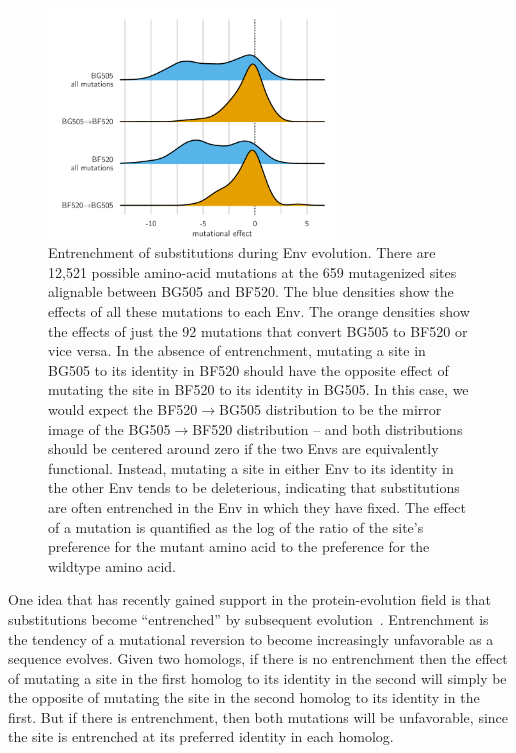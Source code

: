 \documentclass[9pt]{elife}
\begin{document}
\begin{figure}
\centerline{\includegraphics[clip=true, trim=0in 0in 0in 0.7in, width=0.68\textwidth]{figures/entrenchment.pdf}}
\caption{\label{fig:entrenchment}
Entrenchment of substitutions during Env evolution.
There are 12,521 possible amino-acid mutations at the 659 mutagenized sites alignable between BG505 and BF520.
The blue densities show the effects of all these mutations to each Env.
The orange densities show the effects of just the 92 mutations that convert BG505 to BF520 or vice versa.
In the absence of entrenchment, mutating a site in BG505 to its identity in BF520 should have the opposite effect of mutating the site in BF520 to its identity in BG505.
In this case, we would expect the BF520$\rightarrow$BG505 distribution to be the mirror image of the BG505$\rightarrow$BF520 distribution -- and both distributions should be centered around zero if the two Envs are equivalently functional.
Instead, mutating a site in either Env to its identity in the other Env tends to be deleterious, indicating that substitutions are often entrenched in the Env in which they have fixed.
The effect of a mutation is quantified as the log of the ratio of the site's preference for the mutant amino acid to the preference for the wildtype amino acid.
}
\end{figure}

One idea that has recently gained support in the protein-evolution field is that substitutions become ``entrenched'' by subsequent evolution~\citep{pollock2012amino,shah2015contingency,starr2017pervasive}.
Entrenchment is the tendency of a mutational reversion to become increasingly unfavorable as a sequence evolves.
Given two homologs, if there is no entrenchment then the effect of mutating a site in the first homolog to its identity in the second will simply be the opposite of mutating the site in the second homolog to its identity in the first.
But if there is entrenchment, then both mutations will be unfavorable, since the site is entrenched at its preferred identity in each homolog.
\end{document}
